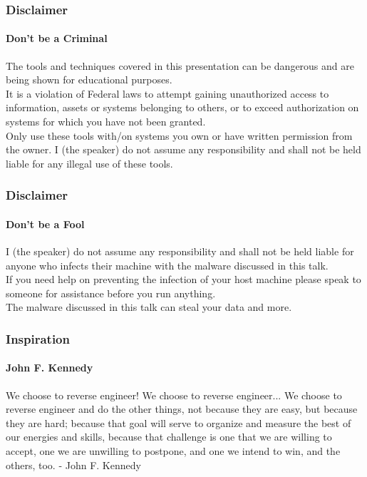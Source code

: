 \documentclass[aspectratio=169]{beamer}
\begin{document}
\begin{frame}
  \frametitle{Disclaimer}
  \framesubtitle{Don't be a Criminal}
  \begin{tcolorbox}[title=disclaimer\_0.log,colback=gray]
    The tools and techniques covered in this presentation can be dangerous and are\\
    being shown for educational purposes.\\
    \newline
    It is a violation of Federal laws to attempt gaining unauthorized access to information, assets or systems belonging to others, or to exceed authorization on systems for which you have not been granted.\\
    \newline
    Only use these tools with/on systems you own or have written permission from the owner. I (the speaker) do not assume any responsibility and shall not be held liable for any illegal use of these tools.\\
  \end{tcolorbox}
\end{frame}

\begin{frame}
  \frametitle{Disclaimer}
  \framesubtitle{Don't be a Fool}
  \begin{tcolorbox}[title=disclaimer\_1.log,colback=gray]
    I (the speaker) do not assume any responsibility and shall not be held
    liable for anyone who infects their machine with the malware discussed in
    this talk. \\
    \newline
    If you need help on preventing the infection of your host machine please
    speak to someone for assistance before you run anything. \\
    \newline
    The malware discussed in this talk can steal your data and more. \\
  \end{tcolorbox}
\end{frame}

\begin{frame}
  \frametitle{Inspiration}
  \framesubtitle{John F. Kennedy}
  \begin{tcolorbox}[title=john\_f\_kennedy.log,colback=gray]
    We choose to reverse engineer! We choose to reverse
    engineer... We choose to reverse engineer and do the other things, not
    because they are easy, but because they are hard; because that goal will
    serve to organize and measure the best of our energies and skills, because
    that challenge is one that we are willing to accept, one we are unwilling to
    postpone, and one we intend to win, and the others, too. - John F. Kennedy \\
  \end{tcolorbox}
\end{frame}
\end{document}
